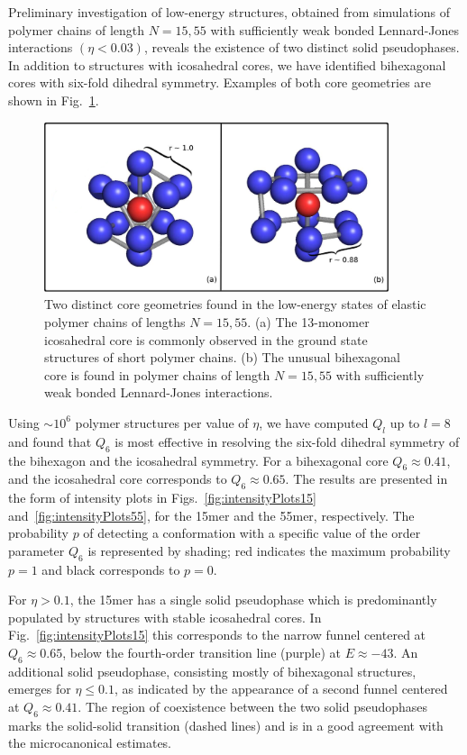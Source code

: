 \documentclass[12pt]{report}
\begin{document}
%
Preliminary investigation of low-energy structures, obtained from simulations of polymer chains of length $N =15,55$ with sufficiently weak bonded Lennard-Jones interactions $(\eta < 0.03)$, reveals the existence of two distinct solid pseudophases. In addition to structures with icosahedral cores, we have identified bihexagonal cores with six-fold dihedral symmetry. Examples of both core geometries are shown in Fig.~\ref{fig:coreStructures}.
%
\begin{figure}
\center
	\includegraphics[width=0.9\textwidth]{chapter6Figs/configurationsMod.eps}			\caption{\label{fig:coreStructures} Two distinct core geometries found in the low-energy states of elastic polymer chains of lengths $N = 15,55$. (a) The 13-monomer icosahedral core is commonly observed in the ground state structures of short polymer chains. (b) The unusual bihexagonal core is found in polymer chains of length $N =15,55$ with sufficiently weak bonded Lennard-Jones interactions.}
\end{figure}
%
Using $\sim 10^{6}$ polymer structures per value of $\eta$, we have computed $Q_{l}$ up to $l = 8$ and found that $Q_{6}$ is most effective in resolving the six-fold dihedral symmetry of the bihexagon and the icosahedral symmetry. For a bihexagonal core $Q_{6} \approx 0.41$, and the icosahedral core corresponds to $Q_{6} \approx 0.65$. The results are presented in the form of intensity plots in Figs.~\ref{fig:intensityPlots15} and~\ref{fig:intensityPlots55}, for the 15mer and the 55mer, respectively. The probability $p$ of detecting a conformation with a specific value of the order parameter $Q_{6}$ is represented by shading; red indicates the maximum probability $p=1$ and black corresponds to $p=0$.
%

%
For $\eta > 0.1$, the 15mer has a single solid pseudophase which is predominantly populated by structures with stable icosahedral cores. In Fig.~\ref{fig:intensityPlots15} this corresponds to the narrow funnel centered at $Q_{6} \approx 0.65$, below the fourth-order transition line (purple) at $E \approx -43$. An additional solid pseudophase, consisting mostly of bihexagonal structures, emerges for $\eta \leq 0.1$, as indicated by the appearance of a second funnel centered at $Q_{6} \approx 0.41$. The region of coexistence between the two solid pseudophases marks the solid-solid transition (dashed lines) and is in a good agreement with the microcanonical estimates. 
%
\end{document}
